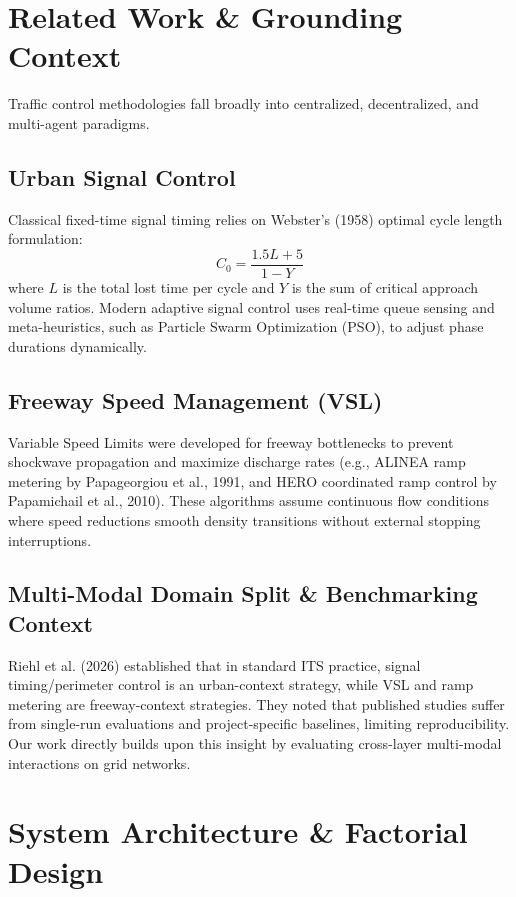 \documentclass[journal,twocolumn]{IEEEtran}
\begin{document}
\section{Related Work \& Grounding Context}
Traffic control methodologies fall broadly into centralized, decentralized, and multi-agent paradigms.

\subsection{Urban Signal Control}
Classical fixed-time signal timing relies on Webster's (1958) optimal cycle length formulation:
\begin{equation}
C_0 = \frac{1.5L + 5}{1 - Y}
\end{equation}
where $L$ is the total lost time per cycle and $Y$ is the sum of critical approach volume ratios. Modern adaptive signal control uses real-time queue sensing and meta-heuristics, such as Particle Swarm Optimization (PSO), to adjust phase durations dynamically.

\subsection{Freeway Speed Management (VSL)}
Variable Speed Limits were developed for freeway bottlenecks to prevent shockwave propagation and maximize discharge rates (e.g., ALINEA ramp metering by Papageorgiou et al., 1991, and HERO coordinated ramp control by Papamichail et al., 2010). These algorithms assume continuous flow conditions where speed reductions smooth density transitions without external stopping interruptions.

\subsection{Multi-Modal Domain Split \& Benchmarking Context}
Riehl et al. (2026) established that in standard ITS practice, signal timing/perimeter control is an urban-context strategy, while VSL and ramp metering are freeway-context strategies. They noted that published studies suffer from single-run evaluations and project-specific baselines, limiting reproducibility. Our work directly builds upon this insight by evaluating cross-layer multi-modal interactions on grid networks.

\section{System Architecture \& Factorial Design}
\end{document}
